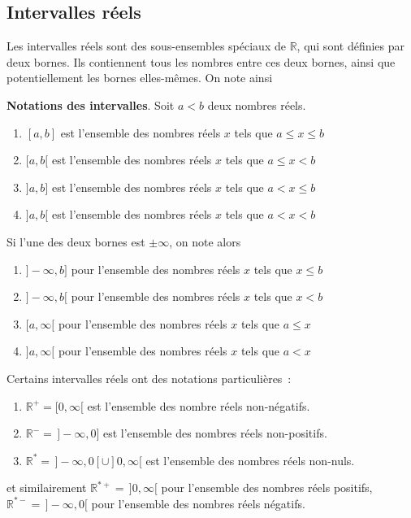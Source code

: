 \subsection{Intervalles réels}
Les intervalles réels sont des sous-ensembles spéciaux de $\mathbb{R}$, qui sont définies par deux bornes. Ils contiennent tous les nombres entre ces deux bornes, ainsi que potentiellement les bornes elles-mêmes. On note ainsi
\begin{greybox}
\textbf{Notations des intervalles}.
Soit $a < b$ deux nombres réels.
\begin{enumerate}
    \item $[a, b]$ est l'ensemble des nombres réels $x$ tels que $a \leq x \leq b$
    \item $[a, b[$ est l'ensemble des nombres réels $x$ tels que $a \leq x < b$
    \item $]a, b]$ est l'ensemble des nombres réels $x$ tels que $a < x \leq b$
    \item $]a, b[$ est l'ensemble des nombres réels $x$ tels que $a < x < b$
\end{enumerate}
Si l'une des deux bornes est $\pm \infty$, on note alors
\begin{enumerate}
    \item $]\!-\!\infty, b]$ pour l'ensemble des nombres réels $x$ tels que $x \leq b$
    \item $]\!-\!\infty, b[$ pour l'ensemble des nombres réels $x$ tels que $x < b$
    \item $[a, \infty[$ pour l'ensemble des nombres réels $x$ tels que $a \leq x$
    \item $]a, \infty[$ pour l'ensemble des nombres réels $x$ tels que $a < x$
\end{enumerate}
\end{greybox}
Certains intervalles réels ont des notations particulières~:
\begin{greybox}
\begin{enumerate}
    \item $\mathbb{R}^+ = [0, \infty[$ est l'ensemble des nombre réels non-négatifs.
    \item $\mathbb{R}^- = \,]\!-\!\infty, 0]$ est l'ensemble des nombres réels non-positifs.
    \item $\mathbb{R}^* = \,]\!-\!\infty, 0[ \cup ]0, \infty[$  est l'ensemble des nombres réels non-nuls.
\end{enumerate}
\end{greybox}
et similairement $\mathbb{R}^{*+} = \,]0, \infty[$ pour l'ensemble des nombres réels positifs, $\mathbb{R}^{*-} = \,]\!-\!\infty, 0[$ pour l'ensemble des nombres réels négatifs.

